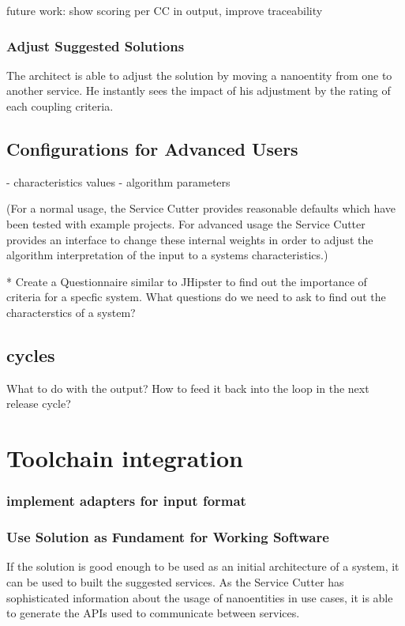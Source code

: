 future work: show scoring per CC in output, improve traceability

\subsubsection{Adjust Suggested Solutions}

The architect is able to adjust the solution by moving a nanoentity from one to another service. He instantly sees the impact of his adjustment by the rating of each coupling criteria.


\subsection{Configurations for Advanced Users}

- characteristics values
- algorithm parameters

(For a normal usage, the Service Cutter provides reasonable defaults which have been tested with example projects. For advanced usage the Service Cutter provides an interface to change these internal weights in order to adjust the algorithm interpretation of the input to a systems characteristics.) 


* Create a Questionnaire similar to JHipster to find out the importance of criteria for a specfic system. What questions do we need to ask to find out the characterstics of a system? 

\subsection{cycles}

What to do with the output? How to feed it back into the loop in the next release cycle?

\section{Toolchain integration}

\subsubsection{implement adapters for input format}

\subsubsection{Use Solution as Fundament for Working Software}

If the solution is good enough to be used as an initial architecture of a system, it can be used to built the suggested services. As the Service Cutter has sophisticated information about the usage of nanoentities in use cases, it is able to generate the APIs used to communicate between services. 

